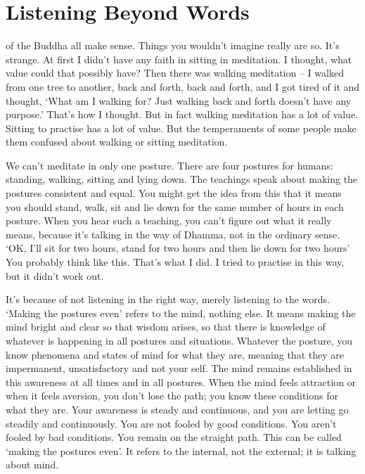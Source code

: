 
\chapter{Listening Beyond Words}

 of the Buddha all make sense. Things you wouldn't imagine really are so. It's strange. At first I didn't have any faith in sitting in meditation. I thought, what value could that possibly have? Then there was walking meditation -- I walked from one tree to another, back and forth, back and forth, and I got tired of it and thought, `What am I walking for? Just walking back and forth doesn't have any purpose.' That's how I thought. But in fact walking meditation has a lot of value. Sitting to practise  has a lot of value. But the temperaments of some people make them confused about walking or sitting meditation.

We can't meditate in only one posture. There are four postures for humans: standing, walking, sitting and lying down. The teachings speak about making the postures consistent and equal. You might get the idea from this that it means you should stand, walk, sit and lie down for the same number of hours in each posture. When you hear such a teaching, you can't figure out what it really means, because it's talking in the way of Dhamma, not in the ordinary sense. `OK, I'll sit for two hours, stand for two hours and then lie down for two hours' You probably think like this. That's what I did. I tried to practise in this way, but it didn't work out.

It's because of not listening in the right way, merely listening to the words. `Making the postures even' refers to the mind, nothing else. It means making the mind bright and clear so that wisdom arises, so that there is knowledge of whatever is happening in all postures and situations. Whatever the posture, you know phenomena and states of mind for what they are, meaning that they are impermanent, unsatisfactory and not your self. The mind remains established in this awareness at all times and in all postures. When the mind feels attraction or when it feels aversion, you don't lose the path; you know these conditions for what they are. Your awareness is steady and continuous, and you are letting go steadily and continuously. You are not fooled by good conditions. You aren't fooled by bad conditions. You remain on the straight path. This can be called `making the postures even'. It refers to the internal, not the external; it is talking about mind.

